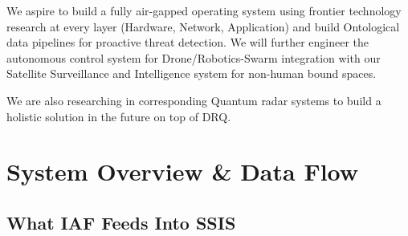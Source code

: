 \documentclass[11pt,a4paper]{article}
\begin{document}
We aspire to build a fully air-gapped operating system using frontier technology research at every layer (Hardware, Network, Application) and build Ontological data pipelines for proactive threat detection. We will further engineer the autonomous control system for Drone/Robotics-Swarm integration with our Satellite Surveillance and Intelligence system for non-human bound spaces.

We are also researching in corresponding Quantum radar systems to build a holistic solution in the future on top of DRQ.

\newpage

\begin{center}
\end{center}

\newpage
\tableofcontents
\newpage

\section{System Overview \& Data Flow}

\subsection{What IAF Feeds Into SSIS}
\end{document}
